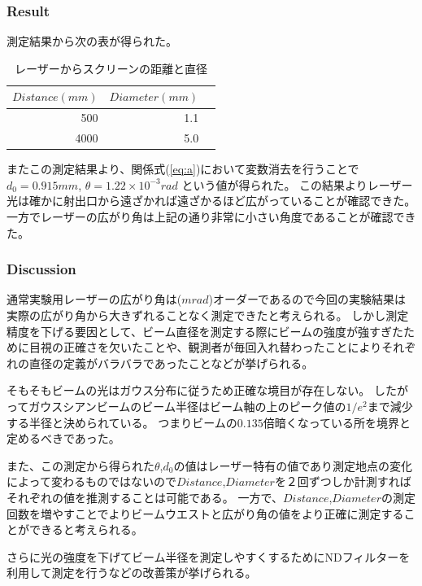 \documentclass[11pt, a4paper]{jsarticle}
\begin{document}
\subsubsection{Result}
測定結果から次の表が得られた。
\begin{table}[htb]
  \begin{center}
    \caption{レーザーからスクリーンの距離と直径}
    \begin{tabular}{rrr} \hline
        $Distance(mm)$ & $Diameter(mm)$  \\ \hline
        500            & 1.1 \\
        4000           & 5.0 \\ \hline
    \end{tabular}
    \label{tab:a}
  \end{center}
\end{table}


またこの測定結果より、関係式(\ref{eq:a})において変数消去を行うことで$d_0 = 0.915mm$, $\theta = 1.22 \times 10 ^{-3}rad$
という値が得られた。
この結果よりレーザー光は確かに射出口から遠ざかれば遠ざかるほど広がっていることが確認できた。
一方でレーザーの広がり角は上記の通り非常に小さい角度であることが確認できた。
\subsubsection{Discussion}
通常実験用レーザーの広がり角は($mrad$)オーダーであるので今回の実験結果は実際の広がり角から大きずれることなく測定できたと考えられる。
しかし測定精度を下げる要因として、ビーム直径を測定する際にビームの強度が強すぎたために目視の正確さを欠いたことや、観測者が毎回入れ替わったことによりそれぞれの直径の定義がバラバラであったことなどが挙げられる。

そもそもビームの光はガウス分布に従うため正確な境目が存在しない。
したがってガウスシアンビームのビーム半径はビーム軸の上のピーク値の$1/e^2$まで減少する半径と決められている。
つまりビームの$0.135$倍暗くなっている所を境界と定めるべきであった。

また、この測定から得られた$\theta$,$d_0$の値はレーザー特有の値であり測定地点の変化によって変わるものではないので$Distance$,$Diameter$を２回ずつしか計測すればそれぞれの値を推測することは可能である。
一方で、$Distance$,$Diameter$の測定回数を増やすことでよりビームウエストと広がり角の値をより正確に測定することができると考えられる。

さらに光の強度を下げてビーム半径を測定しやすくするためにNDフィルターを利用して測定を行うなどの改善策が挙げられる。
\end{document}
